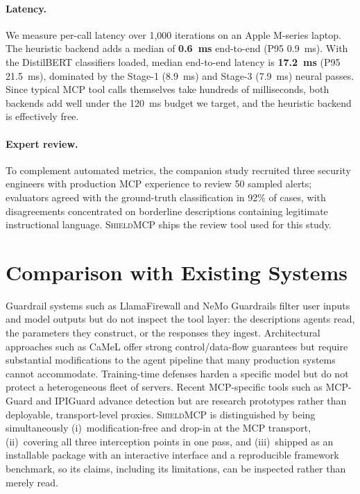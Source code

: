 \documentclass[11pt]{article}
\newcommand{\shield}{\textsc{ShieldMCP}}
\begin{document}
\paragraph{Latency.}
We measure per-call latency over 1{,}000 iterations on an Apple M-series laptop. The
heuristic backend adds a median of \textbf{0.6~ms} end-to-end (P95 0.9~ms). With the
DistilBERT classifiers loaded, median end-to-end latency is \textbf{17.2~ms} (P95
21.5~ms), dominated by the Stage-1 (8.9~ms) and Stage-3 (7.9~ms) neural passes. Since
typical MCP tool calls themselves take hundreds of milliseconds, both backends add
well under the 120~ms budget we target, and the heuristic backend is effectively
free.

\paragraph{Expert review.}
To complement automated metrics, the companion study \citep{yergattikar2026securing}
recruited three security
engineers with production MCP experience to review 50 sampled alerts; evaluators
agreed with the ground-truth classification in 92\% of cases, with disagreements
concentrated on borderline descriptions containing legitimate instructional
language. \shield{} ships the review tool used for this study.

\section{Comparison with Existing Systems}

Guardrail systems such as LlamaFirewall \citep{chennabasappa2025llamafirewall} and
NeMo Guardrails filter user inputs and model outputs but do not inspect the tool
layer: the descriptions agents read, the parameters they construct, or the responses
they ingest. Architectural approaches such as CaMeL \citep{debenedetti2025camel}
offer strong control/data-flow guarantees but require substantial modifications to
the agent pipeline that many production systems cannot accommodate. Training-time
defenses harden a specific model but do not protect a heterogeneous fleet of servers.
Recent MCP-specific tools such as MCP-Guard \citep{xing2025mcpguard} and IPIGuard
\citep{an2025ipiguard} advance detection but are research prototypes rather than
deployable, transport-level proxies. \shield{} is distinguished by being
simultaneously (i)~modification-free and drop-in at the MCP transport, (ii)~covering
all three interception points in one pass, and (iii)~shipped as an installable
package with an interactive interface and a reproducible framework benchmark, so its
claims, including its limitations, can be inspected rather than merely read.
\end{document}
